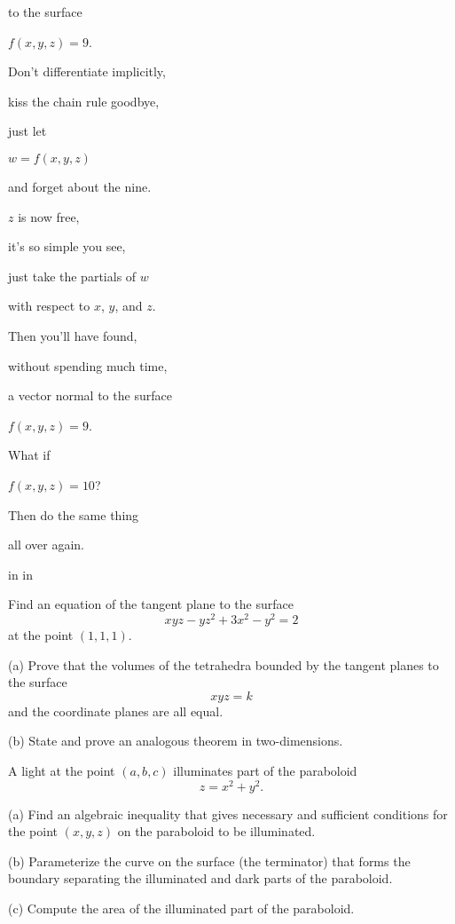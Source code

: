 \documentclass{ximera}
\newcommand{\pskip}{\vskip 0.1 in}
\begin{document}
to the surface

$f(x,y,z)=9$.

Don't differentiate implicitly,

kiss the chain rule goodbye,

just let 

$w=f(x,y,z)$

and forget about the nine.

$z$ is now free,

it's so simple you see,

just take the partials of $w$

with respect to $x$, $y$, and $z$.

Then you'll have found,

without spending much time,

a vector normal to the surface

$f(x,y,z) = 9$.

What if 

$f(x,y,z) = 10$?

Then do the same thing

all over again.


\pskip\pskip

\begin{question} \label{Qdfbtt44}
Find an equation of the tangent plane to the surface
\[
    xyz - yz^2 +3x^2 -y^2 = 2
\]
at the point $(1,1,1)$.
\end{question}

\begin{question}  \label{Q435r4gt}
(a) Prove that the volumes of the tetrahedra bounded by the tangent planes to the surface
\[
    xyz = k
\]
and the coordinate planes are all equal.

(b) State and prove an analogous theorem in two-dimensions.
\end{question}


\begin{question}  \label{Qweregtt5}
A light at the point $(a,b,c)$ illuminates part of the paraboloid
\[
   z = x^2 + y^2.
\]

(a) Find an algebraic inequality that gives necessary and sufficient conditions for the point $(x,y,z)$ on the paraboloid to be illuminated.

(b) Parameterize the curve on the surface (the terminator) that forms the boundary separating the illuminated and dark parts of the paraboloid. 

(c) Compute the area of the illuminated part of the paraboloid.
\end{question}
\end{document}
